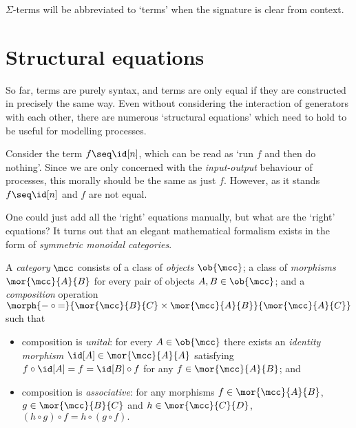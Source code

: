 \(\Sigma\)-terms will be abbreviated to `terms' when the signature is clear from
context.

\section{Structural equations}

So far, terms are purely syntax, and terms are only equal if they are
constructed in precisely the same way.
Even without considering the interaction of generators with each other, there
are numerous `structural equations' which need to hold to be useful for
modelling processes.

\begin{example}
    Consider the term \(f \seq \id[n]\), which can be read as `run \(f\) and
    then do nothing'.
    Since we are only concerned with the \emph{input-output} behaviour of
    processes, this morally should be the same as just \(f\).
    However, as it stands \(f \seq \id[n]\) and \(f\) are not equal.
\end{example}

One could just add all the `right' equations manually, but what are the `right'
equations?
It turns out that an elegant mathematical formalism exists in the form of
\emph{symmetric monoidal categories}.

\begin{definition}[Categories]
    \label{def:category}
    A \emph{category} \(\mcc\) consists of a class of \emph{objects}
    \(\ob{\mcc}\); a class of \emph{morphisms} \(\mor{\mcc}{A}{B}\)
    for every pair of objects \(A, B \in \ob{\mcc}\); and a \emph{composition}
    operation \(
        \morph{
            {-} \circ {=}
        }{
            \mor{\mcc}{B}{C} \times \mor{\mcc}{A}{B}
        }{
            \mor{\mcc}{A}{C}
        }
    \) such that
    \begin{itemize}
        \item composition is \emph{unital}: for every \(
                    A \in \ob{\mcc}
                \) there exists an \emph{identity morphism} \(
                    \id[A] \in \mor{\mcc}{A}{A}
                \) satisfying \(
                    f \circ \id[A] = f = \id[B] \circ f
                \) for any \(
                    f \in \mor{\mcc}{A}{B}
                \); and
        \item composition is \emph{associative}: for any morphisms \(
                    f \in \mor{\mcc}{A}{B}
                \), \(
                    g \in \mor{\mcc}{B}{C}
                \) and \(h \in \mor{\mcc}{C}{D}\), \(
                    (h \circ g) \circ f = h \circ (g \circ f).
                \)
    \end{itemize}
\end{definition}

